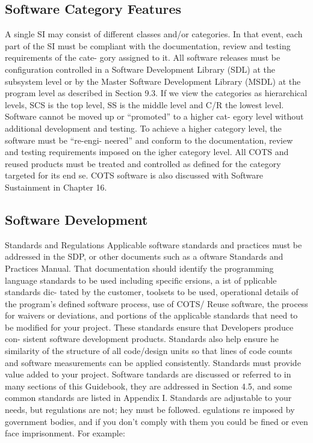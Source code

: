 \documentclass{book}
\begin{document}
\begin{multicols}{2}
\subsection{Software Category Features}
A single SI may consist of different classes and/or categories.
In that event, each part of the SI must be compliant with the
documentation, review and testing requirements of the cate-
gory assigned to it. All software releases must be configuration
controlled in a Software Development Library (SDL) at the
subsystem level or by the Master Software Development Library
(MSDL) at the program level as described in Section 9.3.
If we view the categories as hierarchical levels, SCS is
the top level, SS is the middle level and C/R the lowest level.
Software cannot be moved up or “promoted” to a higher cat-
egory level without additional development and testing. To
achieve a higher category level, the software must be “re-engi-
neered” and conform to the documentation, review and testing
requirements imposed on the igher category level. All COTS
and reused products must be treated and controlled as defined
for the category targeted for its end se. COTS software is also
discussed with Software Sustainment in Chapter 16.

\subsection{Software Development}
Standards and Regulations
Applicable software standards and practices must be
addressed in the SDP, or other documents such as a oftware
Standards and Practices Manual. That documentation should
identify the programming language standards to be used
including specific ersions, a ist of pplicable standards dic-
tated by the customer, toolsets to be used, operational details
of the program’s defined software process, use of COTS/
Reuse software, the process for waivers or deviations, and
portions of the applicable standards that need to be modified
for your project.
These standards ensure that Developers produce con-
sistent software development products. Standards also help
ensure he similarity of the structure of all code/design units
so that lines of code counts and software measurements can
be applied consistently. Standards must provide value added
to your project.
Software tandards are discussed or referred to in many
sections of this Guidebook, they are addressed in Section
4.5, and some common standards are listed in Appendix I.
Standards are adjustable to your needs, but regulations are
not; hey must be followed. egulations re imposed by
government bodies, and if you don’t comply with them you
could be fined or even face imprisonment. For example:


\end{multicols}
\end{document}
